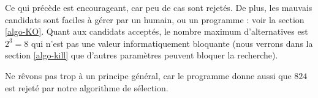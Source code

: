 Ce qui précède est encourageant, car peu de cas sont rejetés.
De plus, les mauvais candidats sont faciles à gérer par un humain, ou un programme : voir la section \ref{algo-KO}.
Quant aux candidats acceptés, le nombre maximum d'alternatives est $2^3 = 8$ qui n'est pas une valeur informatiquement bloquante (nous verrons dans la section \ref{algo-kill} que d'autres paramètres peuvent bloquer la recherche).



\begin{remark}
	Ne rêvons pas trop à un principe général, car le programme donne aussi que $824$ est rejeté par notre algorithme de sélection.
\end{remark}